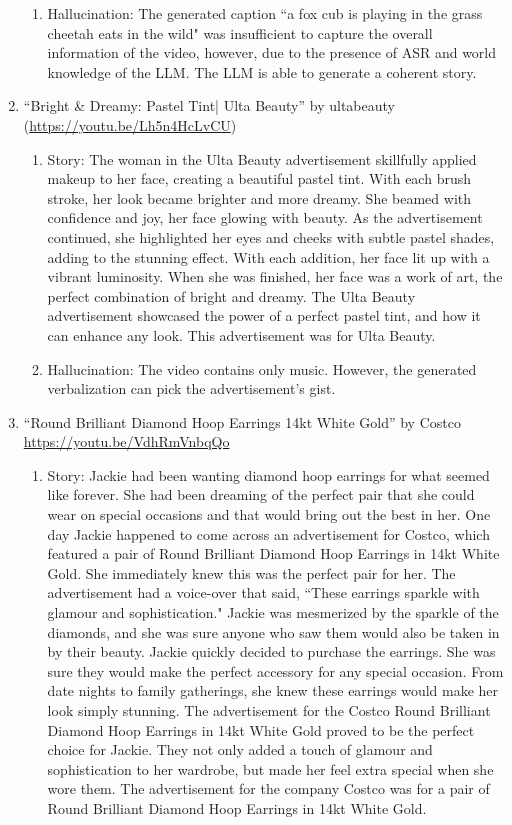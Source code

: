 \documentclass[hidelinks,11pt,a4paper]{report}
\begin{document}
\begin{enumerate}
\begin{enumerate}
        \item Hallucination: The generated caption ``a fox cub is playing in the grass cheetah eats in the wild" was insufficient to capture the overall information of the video, however, due to the presence of ASR and world knowledge of the LLM. The LLM is able to generate a coherent story. 
    \end{enumerate}

        \item ``Bright \& Dreamy: Pastel Tint| Ulta Beauty'' by ultabeauty (\url{https://youtu.be/Lh5n4HcLvCU}) 
        \begin{enumerate}
            \item Story: The woman in the Ulta Beauty advertisement skillfully applied makeup to her face, creating a beautiful pastel tint. With each brush stroke, her look became brighter and more dreamy. She beamed with confidence and joy, her face glowing with beauty. As the advertisement continued, she highlighted her eyes and cheeks with subtle pastel shades, adding to the stunning effect. With each addition, her face lit up with a vibrant luminosity. When she was finished, her face was a work of art, the perfect combination of bright and dreamy. The Ulta Beauty advertisement showcased the power of a perfect pastel tint, and how it can enhance any look. This advertisement was for Ulta Beauty.

            \item Hallucination: The video contains only music. However, the generated verbalization can pick the advertisement's gist. 
        \end{enumerate}
        
        \item ``Round Brilliant Diamond Hoop Earrings 14kt White Gold'' by Costco \url{https://youtu.be/VdhRmVnbqQo} 
        \begin{enumerate}
            \item Story: Jackie had been wanting diamond hoop earrings for what seemed like forever. She had been dreaming of the perfect pair that she could wear on special occasions and that would bring out the best in her. One day Jackie happened to come across an advertisement for Costco, which featured a pair of Round Brilliant Diamond Hoop Earrings in 14kt White Gold. She immediately knew this was the perfect pair for her. The advertisement had a voice-over that said, “These earrings sparkle with glamour and sophistication." Jackie was mesmerized by the sparkle of the diamonds, and she was sure anyone who saw them would also be taken in by their beauty. Jackie quickly decided to purchase the earrings. She was sure they would make the perfect accessory for any special occasion. From date nights to family gatherings, she knew these earrings would make her look simply stunning. The advertisement for the Costco Round Brilliant Diamond Hoop Earrings in 14kt White Gold proved to be the perfect choice for Jackie. They not only added a touch of glamour and sophistication to her wardrobe, but made her feel extra special when she wore them. The advertisement for the company Costco was for a pair of Round Brilliant Diamond Hoop Earrings in 14kt White Gold.
            

\end{enumerate}
\end{enumerate}
\end{document}
